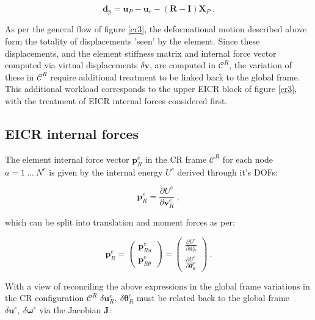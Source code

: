 \begin{equation} 
\mathbf{d}_p = 
\mathbf{u}_P - \mathbf{u}_{c} - (\mathbf{R} - \mathbf{I}) \mathbf{X}_P 
\label{eq_cr3}\ .
\end{equation}

As per the general flow of figure \ref{cr3}, the deformational motion described above form the totality of displacements 'seen' by the element. Since these displacements, and the element stiffness matrix and internal force vector computed via virtual displacements $\delta \mathbf{v}$, are computed in $\mathscr{C}^R$, the variation of these in $\mathscr{C}^R$ require additional treatment to be linked back to the global frame. This additional workload corresponds to the upper EICR block of figure \ref{cr3}, with the treatment of EICR internal forces considered first.

\subsection{EICR internal forces}
The element internal force vector $\mathbf{p}_R^e$ in the CR frame $\mathscr{C}^R$ for each node $a = 1\ ...\ N^e$ is given by the internal energy $U^e$ derived through it's DOFs:

\begin{equation} 
\mathbf{p}_R^e = 
\frac{\partial U^e}{\partial \mathbf{v}_R^e}
\label{eq_cr4}\ ,
\end{equation}

which can be split into translation and moment forces as per:

\begin{equation} 
\mathbf{p}_R^e = 
\begin{pmatrix}
\mathbf{p}_{Ru}^e \\
\mathbf{p}_{R\theta}^e 
\end{pmatrix}
=
\begin{pmatrix}
\frac{\partial U^e}{\partial \mathbf{u}_{R}^e} \\
\frac{\partial U^e}{\partial \boldsymbol{\theta}_{R}^e} 
\end{pmatrix}
\label{eq_cr5}\ .
\end{equation}

With a view of reconciling the above expressions in the global frame variations in the CR configuration $\mathscr{C}^R$ $\delta \mathbf{u}_{R}^e,\ \delta \boldsymbol{\theta}_{R}^e$ must be related back to the global frame $\delta \mathbf{u}^e,\ \delta \boldsymbol{\omega}^e$ via the Jacobian $\mathbf{J}$:

